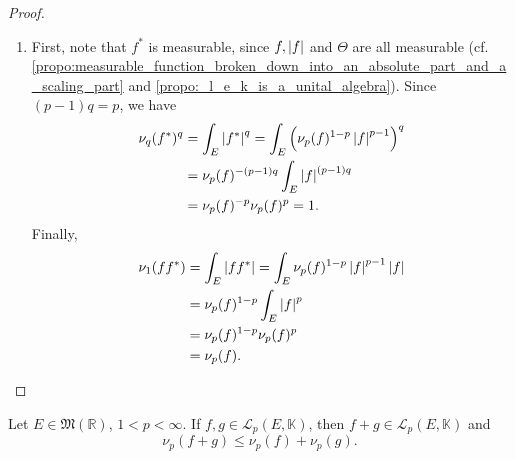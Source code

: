 \documentclass[notoc,notitlepage]{tufte-book}
\begin{document}
\begin{proof}
\begin{enumerate}
    \item First, note that $f^*$ is measurable, since $f, \left|f\right|$ and $\Theta$ 
      are all measurable (cf.
      \cref{propo:measurable_function_broken_down_into_an_absolute_part_and_a_scaling_part}
      and \cref{propo:_l_e_k_is_a_unital_algebra}). Since $(p-1)q = p$, we have
      \begin{align*}
        \nu_q(f^*)^q &= \int_{E} \left|f^*\right|^q = \int_{E} \left( \nu_p(f)^{1-p}
                      \left|f\right|^{p-1} \right)^q \\
                     &= \nu_p(f)^{-(p-1)q} \int_{E} \left|f\right|^{(p-1)q} \\
                     &= \nu_p(f)^{-p} \nu_p(f)^{p} = 1.
      \end{align*}
      Finally,
      \begin{align*}
        \nu_1(ff^*) &= \int_{E} \left|ff^*\right|
                     = \int_{E} \nu_p(f)^{1-p} \left|f\right|^{p-1} \left|f\right| \\
                    &= \nu_p(f)^{1-p} \int_{E} \left|f\right|^p \\
                    &= \nu_p(f)^{1-p} \nu_p(f)^{p} \\
                    &= \nu_p(f).
      \end{align*}
  \end{enumerate}
\end{proof}

\begin{thm}\label{thm:minkowski_s_inequality}
  Let $E \in \mathfrak{M}(\mathbb{R})$, $1 < p < \infty$. If $f, g \in
  \mathcal{L}_p(E, \mathbb{K})$, then $f + g \in \mathcal{L}_p(E, \mathbb{K})$ 
  and
  \begin{equation*}
    \nu_p(f + g) \leq \nu_p(f) + \nu_p(g).
  \end{equation*}
\end{thm}
\end{document}
